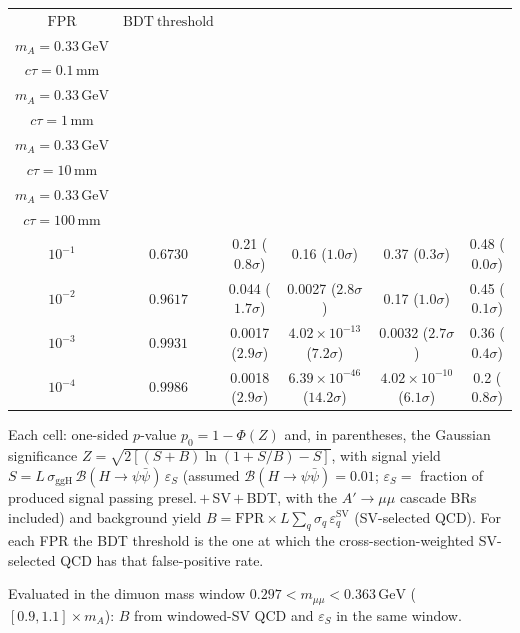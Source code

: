\documentclass[10pt,a4paper]{article}
\begin{document}
{\begin{tabular}{cccccc}
\toprule
$\mathrm{FPR}$ & $\mathrm{BDT\ threshold}$ & \shortstack{$m_{\pi}=1\,\mathrm{GeV}$\\$m_{A}=0.33\,\mathrm{GeV}$\\$c\tau=0.1\,\mathrm{mm}$} & \shortstack{$m_{\pi}=1\,\mathrm{GeV}$\\$m_{A}=0.33\,\mathrm{GeV}$\\$c\tau=1\,\mathrm{mm}$} & \shortstack{$m_{\pi}=1\,\mathrm{GeV}$\\$m_{A}=0.33\,\mathrm{GeV}$\\$c\tau=10\,\mathrm{mm}$} & \shortstack{$m_{\pi}=1\,\mathrm{GeV}$\\$m_{A}=0.33\,\mathrm{GeV}$\\$c\tau=100\,\mathrm{mm}$} \\
\midrule
$10^{-1}$ & $0.6730$ & 0.21 ($0.8\sigma$) & 0.16 ($1.0\sigma$) & 0.37 ($0.3\sigma$) & 0.48 ($0.0\sigma$)\\
$10^{-2}$ & $0.9617$ & 0.044 ($1.7\sigma$) & 0.0027 ($2.8\sigma$) & 0.17 ($1.0\sigma$) & 0.45 ($0.1\sigma$)\\
$10^{-3}$ & $0.9931$ & 0.0017 ($2.9\sigma$) & $4.02\times10^{-13}$ ($7.2\sigma$) & 0.0032 ($2.7\sigma$) & 0.36 ($0.4\sigma$)\\
$10^{-4}$ & $0.9986$ & 0.0018 ($2.9\sigma$) & $6.39\times10^{-46}$ ($14.2\sigma$) & $4.02\times10^{-10}$ ($6.1\sigma$) & 0.2 ($0.8\sigma$)\\
\bottomrule
\end{tabular}

{\small Each cell: one-sided $p$-value $p_0=1-\Phi(Z)$ and, in parentheses, the Gaussian significance $Z=\sqrt{2\left[(S{+}B)\ln(1{+}S/B)-S\right]}$, with signal yield $S=L\,\sigma_{\mathrm{ggH}}\,\mathcal{B}(H\to\psi\bar{\psi})\,\varepsilon_S$ (assumed $\mathcal{B}(H\to\psi\bar{\psi})=0.01$; $\varepsilon_S=$ fraction of produced signal passing presel.\,$+$\,SV\,$+$\,BDT, with the $A'\to\mu\mu$ cascade BRs included) and background yield $B=\mathrm{FPR}\times L\sum_q\sigma_q\,\varepsilon_q^{\mathrm{SV}}$ (SV-selected QCD). For each FPR the BDT threshold is the one at which the cross-section-weighted SV-selected QCD has that false-positive rate.}

{\small Evaluated in the dimuon mass window $0.297<m_{\mu\mu}<0.363\,\mathrm{GeV}$ ($[0.9,1.1]\times m_A$): $B$ from windowed-SV QCD and $\varepsilon_S$ in the same window.}

}\clearpage
\end{document}
